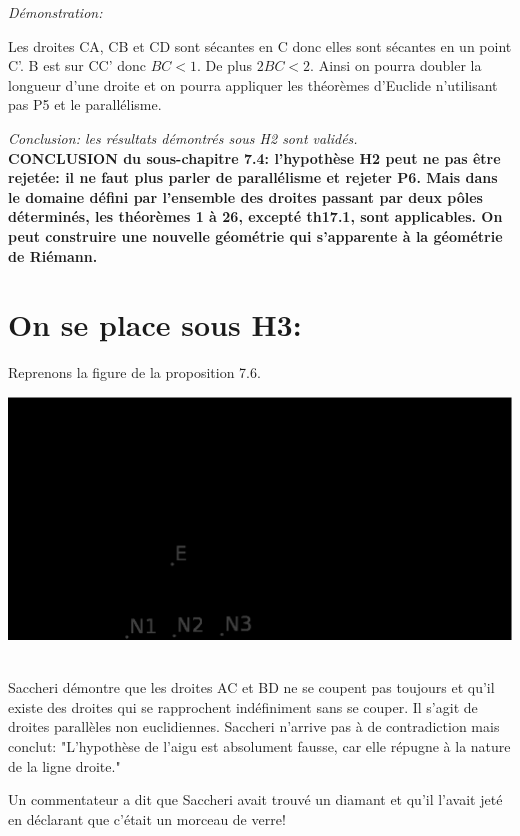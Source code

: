 \documentclass[a4paper, 12pt, twoside]{book}
\begin{document}
     \textit{Démonstration:}\
     
   
  Les droites CA, CB et CD sont sécantes en C donc elles sont sécantes en un point C'. B est sur CC' donc $BC<1$. De plus $2BC<2$. Ainsi on pourra doubler la longueur d'une droite et on pourra appliquer les théorèmes d'Euclide n'utilisant pas P5 et le parallélisme.\
  
    \textit{Conclusion: les résultats démontrés sous H2 sont validés. }\\ 
    
\textbf{CONCLUSION du sous-chapitre 7.4: l'hypothèse H2 peut ne  pas être rejetée: il ne faut plus parler de parallélisme et rejeter P6. Mais dans le domaine défini par l'ensemble des droites passant par deux pôles déterminés, les théorèmes 1 à 26, excepté th17.1, sont applicables.  On peut construire une nouvelle géométrie qui s'apparente à la géométrie de Riémann. } 
   
 \newpage \section{On se place sous H3:} 
 
Reprenons la figure de la proposition 7.6. 
 

    \includegraphics[scale=0.3]{figures/sccH1a.eps} \
    
    Saccheri démontre que les droites AC et BD ne se coupent pas toujours et qu'il existe des droites qui se rapprochent indéfiniment sans se couper. Il s'agit de droites parallèles non euclidiennes. Saccheri n'arrive pas à de contradiction mais conclut: "L'hypothèse de l'aigu est absolument fausse, car elle répugne à la nature de la ligne droite."\
    
    Un commentateur a dit que Saccheri avait trouvé un diamant et qu'il l'avait jeté en déclarant que c'était un morceau de verre!\\
    
\end{document}
